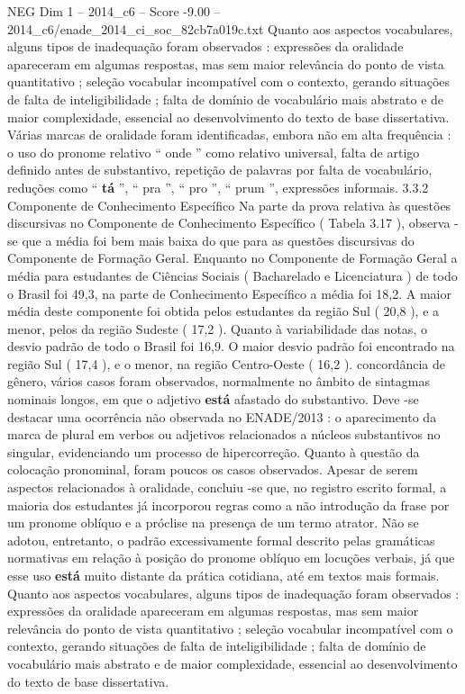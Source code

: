 \begin{textsample}{NEG Dim 1 – 2014\_c6 – Score -9.00 – 2014\_c6/enade\_2014\_ci\_soc\_82cb7a019c.txt}
Quanto aos aspectos vocabulares, alguns tipos de inadequação foram observados : expressões da oralidade apareceram em algumas respostas, mas sem maior relevância do ponto de vista quantitativo ; seleção vocabular incompatível com o contexto, gerando situações de falta de inteligibilidade ; falta de domínio de vocabulário mais abstrato e de maior complexidade, essencial ao desenvolvimento do texto de base dissertativa.
Várias marcas de oralidade foram identificadas, embora não em alta frequência : o uso do pronome relativo “ onde ” como relativo universal, falta de artigo definido antes de substantivo, repetição de palavras por falta de vocabulário, reduções como “ \textbf{tá} ”, “ pra ”, “ pro ”, “ prum ”, expressões informais. 3.3.2 Componente de Conhecimento Específico Na parte da prova relativa às questões discursivas no Componente de Conhecimento Específico ( Tabela 3.17 ), observa -se que a média foi bem mais baixa do que para as questões discursivas do Componente de Formação Geral.
Enquanto no Componente de Formação Geral a média para estudantes de Ciências Sociais ( Bacharelado e Licenciatura ) de todo o Brasil foi 49,3, na parte de Conhecimento Específico a média foi 18,2.
A maior média deste componente foi obtida pelos estudantes da região Sul ( 20,8 ), e a menor, pelos da região Sudeste ( 17,2 ).
Quanto à variabilidade das notas, o desvio padrão de todo o Brasil foi 16,9.
O maior desvio padrão foi encontrado na região Sul ( 17,4 ), e o menor, na região Centro-Oeste ( 16,2 ). concordância de gênero, vários casos foram observados, normalmente no âmbito de sintagmas nominais longos, em que o adjetivo \textbf{está} afastado do substantivo.
Deve -se destacar uma ocorrência não observada no ENADE/2013 : o aparecimento da marca de plural em verbos ou adjetivos relacionados a núcleos substantivos no singular, evidenciando um processo de hipercorreção.
Quanto à questão da colocação pronominal, foram poucos os casos observados.
Apesar de serem aspectos relacionados à oralidade, concluiu -se que, no registro escrito formal, a maioria dos estudantes já incorporou regras como a não introdução da frase por um pronome oblíquo e a próclise na presença de um termo atrator.
Não se adotou, entretanto, o padrão excessivamente formal descrito pelas gramáticas normativas em relação à posição do pronome oblíquo em locuções verbais, já que esse uso \textbf{está} muito distante da prática cotidiana, até em textos mais formais.
Quanto aos aspectos vocabulares, alguns tipos de inadequação foram observados : expressões da oralidade apareceram em algumas respostas, mas sem maior relevância do ponto de vista quantitativo ; seleção vocabular incompatível com o contexto, gerando situações de falta de inteligibilidade ; falta de domínio de vocabulário mais abstrato e de maior complexidade, essencial ao desenvolvimento do texto de base dissertativa.

\end{textsample}
